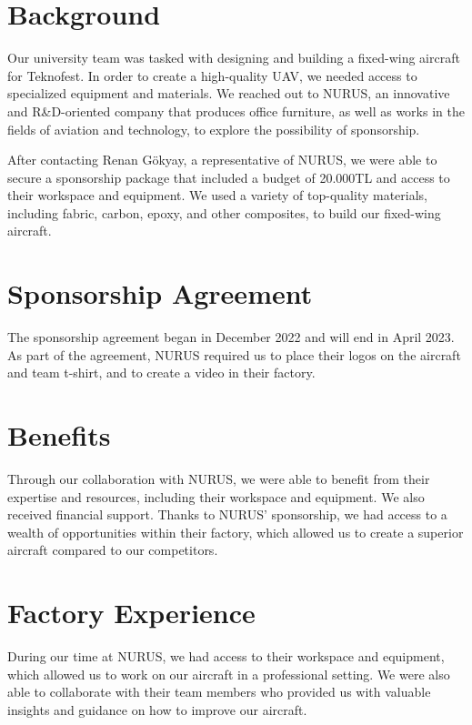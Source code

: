 \documentclass{article}
\begin{document}
\section{Background}

Our university team was tasked with designing and building a fixed-wing aircraft for Teknofest. In order to create a high-quality UAV, we needed access to specialized equipment and materials. We reached out to NURUS, an innovative and R\&D-oriented company that produces office furniture, as well as works in the fields of aviation and technology, to explore the possibility of sponsorship.

After contacting Renan Gökyay, a representative of NURUS, we were able to secure a sponsorship package that included a budget of 20.000TL and access to their workspace and equipment. We used a variety of top-quality materials, including fabric, carbon, epoxy, and other composites, to build our fixed-wing aircraft.

\section{Sponsorship Agreement}

The sponsorship agreement began in December 2022 and will end in April 2023. As part of the agreement, NURUS required us to place their logos on the aircraft and team t-shirt, and to create a video in their factory.

\section{Benefits}

Through our collaboration with NURUS, we were able to benefit from their expertise and resources, including their workspace and equipment. We also received financial support.
Thanks to NURUS' sponsorship, we had access to a wealth of opportunities within their factory, which allowed us to create a superior aircraft compared to our competitors.

\section{Factory Experience}

During our time at NURUS, we had access to their workspace and equipment, which allowed us to work on our aircraft in a professional setting. We were also able to collaborate with their team members who provided us with valuable insights and guidance on how to improve our aircraft.
\end{document}
